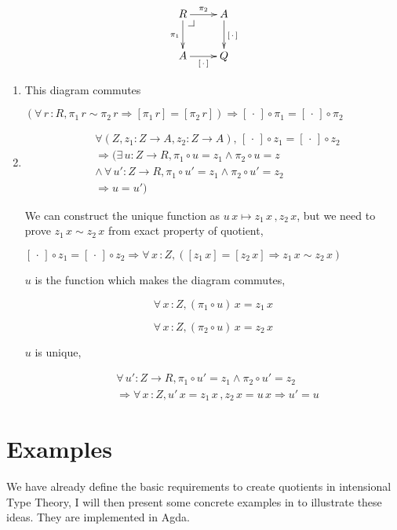 \documentclass[envcountsame]{llncs}
\makeatletter
\newcommand{\dotph}{\,\cdot\,}
\providecommand{\class}[1]{[#1]}
\newcommand{\pullbackcorner}[1][dr]{\save*!/#1-1.2pc/#1:(-1,1)@^{|-}\restore}
\makeatother
\begin{document}
\[\xymatrix{
R\pullbackcorner\ar[r]^{\pi_2}\ar[d]_{\pi_1} & A\ar[d]^{\class\dotph} \\
A\ar[r]_{\class\dotph} & Q
}\]

\begin{enumerate}

\item This diagram commutes

$(\forall \,r\, \colon R, \pi_1 \, r \sim \pi_2 \, r \Rightarrow\class{\pi_1 \,r} = \class{\pi_2 \, r}) \Rightarrow \class\dotph \circ \pi_1 = \class\dotph\circ \pi_2$


\item 
\begin{align*}
&\forall (Z , z_1 \colon Z \to A, z_2 \colon Z \to A), \,
\class{\dotph} \circ z_1 = \class\dotph \circ z_2 \\
&\Rightarrow ( \exists \,u : Z \to R, \pi_1 \circ u = z_1 \wedge  \pi_2
\circ u = z \\
&\wedge \,\forall \,u' \colon Z \to R, \pi_1 \circ u' = z_1 \wedge
\pi_2 \circ u' = z_2 \\
&\Rightarrow u = u') 
\end{align*}

We  can construct the unique function as $u \,x \mapsto z_1 \,x \,, z_2\, x$, but we need to prove $z_1 \,x\sim z_2 \,x$ from exact property of quotient, 

$\class{\dotph} \circ z_1 = \class\dotph \circ z_2 \Rightarrow \forall \,x\, \colon Z, (\class{z_1\,x}=\class{z_2 \,x} \Rightarrow z_{1} \,x \sim z_2 \, x) $

$u$ is the function which makes the diagram commutes,

$$\forall \,x\,\colon Z, (\pi_1 \circ u) \, x = z_1 \,x$$

$$\forall \,x\,\colon Z, (\pi_2 \circ u) \, x = z_2 \,x$$

$u$ is unique,


\begin{align*}
&\forall \,u' \colon Z \to R, \pi_1 \circ u' = z_1 \wedge  \pi_2 \circ u'  = z_2\\ 
&\Rightarrow \forall \,x\,\colon Z, u' \,x = z_1 \,x\,,z_2\,x=u\,x \Rightarrow u' = u
\end{align*}

\end{enumerate}


\section{Examples}
We have already define the basic requirements to create quotients in intensional Type Theory, I will then present some concrete examples in \cite{nuo:10} to illustrate these ideas. They are implemented in Agda. 
\end{document}

